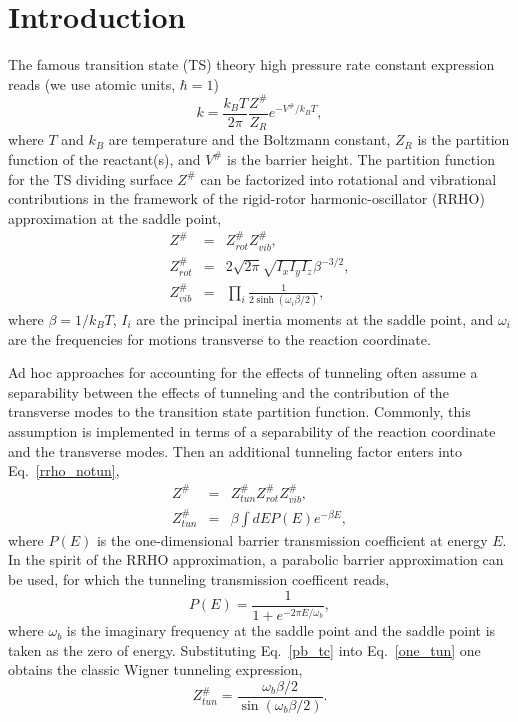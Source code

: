 \documentclass[journal=jpcafh,manuscript=article]{achemso}
\begin{document}
\section{Introduction}
 The famous transition state (TS) theory high pressure rate
constant expression reads\cite{glasstone41} (we use atomic units, $\hbar = 1$)
\begin{equation}
  \label{tst}
  k = \frac{k_BT}{2\pi}\frac{Z^\#}{Z_R} e^{-V^\#/ k_BT},
\end{equation}
where $T$ and $k_B$ are temperature and the Boltzmann constant, $Z_R$
is the partition function of the reactant(s), and $V^\#$ is the
barrier height. The partition function for the TS dividing surface
$Z^\#$ can be factorized into rotational and vibrational contributions
in the framework of the rigid-rotor harmonic-oscillator (RRHO)
approximation at the saddle point,
\begin{eqnarray}
  Z^\#       &=& Z^\#_{rot}Z^\#_{vib},
                 \label{rrho_notun}\\
  Z^\#_{rot }&=& 2\sqrt{2\pi}\sqrt{I_xI_yI_z}\beta^{-3/2},
                 \label{rrho_rot} \\
  Z^\#_{vib}&=& \prod_i\frac{1}{2\sinh(\omega_i\beta/2)},
                \label{rrho_vib}
\end{eqnarray}
where $\beta=1/k_BT$, $I_i$ are the principal inertia moments at the
saddle point, and $\omega_i$ are the frequencies for motions
transverse to the reaction coordinate.

Ad hoc approaches for accounting for the effects of tunneling often
assume a separability between the effects of tunneling and the
contribution of the transverse modes to the transition state partition
function.  Commonly, this assumption is implemented in terms of a
separability of the reaction coordinate and the transverse modes. Then
an additional tunneling factor enters into Eq.~\ref{rrho_notun},
\begin{eqnarray}
  Z^\#       &=&Z^\#_{tun}Z^\#_{rot}Z^\#_{vib},
                 \label{rrho} \\
  Z^\#_{tun}&=&\beta\int dE P(E) e^{-\beta E},
                \label{one_tun}
\end{eqnarray}
where $P(E)$ is the one-dimensional barrier transmission coefficient
at energy $E$. In the spirit of the RRHO approximation, a parabolic
barrier approximation can be used, for which the tunneling
transmission coefficent reads,
\begin{equation}
  \label{pb_tc}
  P(E) = \frac{1}{1 + e^{-2\pi E/\omega_b}},
\end{equation}
where $\omega_b$ is the imaginary frequency at the saddle point and
the saddle point is taken as the zero of energy. Substituting
Eq.~\ref{pb_tc} into Eq.~\ref{one_tun} one obtains the classic Wigner
tunneling expression,\cite{wigner32}
\begin{equation}
  \label{pb_tun}
  Z^\#_{tun}=\frac{\omega_b\beta/2}{\sin(\omega_b\beta/2)}.
\end{equation}
\end{document}
